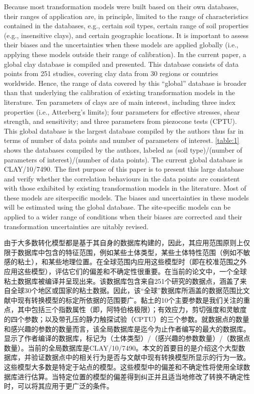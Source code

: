\begin{paracol}{2}
    Because most transformation models were built based on their own databases, their ranges of application are, in principle, limited to the range of characteristics contained in the databases, e.g., certain soil types, certain range of soil properties (e.g., insensitive clays), and certain geographic locations. It is important to assess their biases and the uncertainties when these models are applied globally (i.e., applying these models outside their range of calibration). In the current paper, a global clay database is compiled and presented. This database consists of data points from 251 studies, covering clay data from 30 regions or countries worldwide. Hence, the range of data covered by this “global” database is broader than that underlying the calibration of existing transformation models in the literature. Ten parameters of clays are of main interest, including three index properties (i.e., Atterberg’s limits); four parameters for effective stresses, shear strength, and sensitivity; and three parameters from piezocone tests (CPTU). This global database is the largest database compiled by the authors thus far in terms of number of data points and number of parameters of interest. \autoref{table:1} shows the databases compiled by the authors, labeled as (soil type)/(number of parameters of interest)/(number of data points). The current global database is CLAY/10/7490. The first purpose of this paper is to present this large database and verify whether the correlation behaviours in the data points are consistent with those exhibited by existing transformation models in the literature. Most of these models are sitespecific models. The biases and uncertainties in these models will be estimated using the global database. The site-specific models can be applied to a wider range of conditions when their biases are corrected and their transformation uncertainties are  uitably revised.

    \switchcolumn

    由于大多数转化模型都是基于其自身的数据库构建的，因此，其应用范围原则上仅限于数据库中包含的特征范围，例如某些土体类型，某些土体特性范围（例如不敏感的粘土），和某些地理位置。在全球范围内应用这些模型时（即在校准范围之外应用这些模型），评估它们的偏差和不确定性很重要。在当前的论文中，一个全球粘土数据库被编译并呈现出来。该数据库包含来自251个研究的数据点，涵盖了来自全球30个地区或国家的粘土数据。因此，该“全球”数据库所涵盖的数据范围比文献中现有转换模型的标定所依据的范围要广。黏土的10个主要参数是我们关注的重点，其中包括三个指数属性（即，阿特伯格极限）；有效应力，剪切强度和灵敏度的四个参数；以及带孔压的静力触探试验（CPTU）的三个参数。就数据点的数量和感兴趣的参数的数量而言，该全局数据库是迄今为止作者编写的最大的数据库。显示了作者编译的数据库，标记为（土体类型）/（感兴趣的参数数量）/（数据点数量）。当前的全局数据库是CLAY/10/7490。本文的首要目的是介绍这个大型数据库，并验证数据点中的相关行为是否与文献中现有转换模型所显示的行为一致。这些模型大多数是特定于站点的模型。这些模型中的偏差和不确定性将使用全球数据库进行估算。当特定位置的模型的偏差得到纠正并且适当地修改了转换不确定性时，可以将其应用于更广泛的条件。


\end{paracol}
